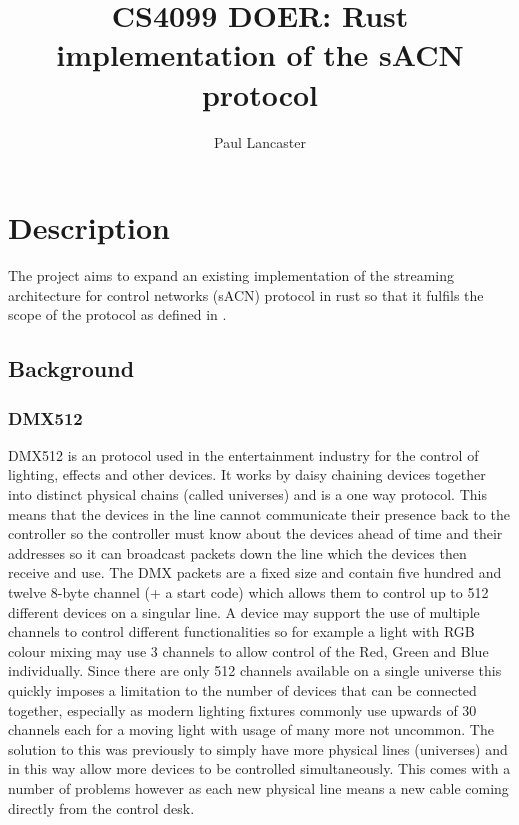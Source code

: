 \documentclass[12pt,a4paper,notitlepage]{report}
\author{Paul Lancaster}
\title{CS4099 DOER: Rust implementation of the sACN protocol}
\begin{document}
	\maketitle
\section*{Description}
	The project aims to expand an existing implementation \cite{ORIGNIAL_IMPL} of the streaming architecture for control networks (sACN) protocol \cite{ANSI_E1.17} in rust so that it fulfils the scope of the protocol as defined in \cite{ANSI_E1.31}.\\
	
\subsection*{Background}
\subsubsection*{DMX512} DMX512 is an protocol used in the entertainment industry for the control of lighting, effects and other devices. It works by daisy chaining devices together into distinct physical chains (called universes) and is a one way protocol. This means that the devices in the line cannot communicate their presence back to the controller so the controller must know about the devices ahead of time and their addresses so it can broadcast packets down the line which the devices then receive and use. The DMX packets are a fixed size and contain five hundred and twelve 8-byte channel (+ a start code) which allows them to control up to 512 different devices on a singular line. A device may support the use of multiple channels to control different functionalities so for example a light with RGB colour mixing may use 3 channels to allow control of the Red, Green and Blue individually. Since there are only 512 channels available on a single universe this quickly imposes a limitation to the number of devices that can be connected together, especially as modern lighting fixtures commonly use upwards of 30 channels each for a moving light with usage of many more not uncommon. The solution to this was previously to simply have more physical lines (universes) and in this way allow more devices to be controlled simultaneously. This comes with a number of problems however as each new physical line means a new cable coming directly from the control desk.
\end{document}
